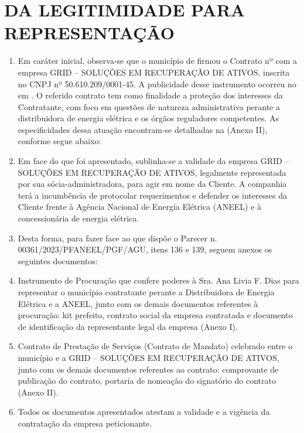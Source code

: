 \section{DA LEGITIMIDADE PARA REPRESENTAÇÃO}

\begin{enumerate}[resume]
\item Em caráter inicial, observa-se que o município de \nomeMunicipio{} firmou o Contrato nº \numeroContrato{} com a empresa GRID – SOLUÇÕES EM RECUPERAÇÃO DE ATIVOS, inscrita no CNPJ nº 50.610.209/0001-45. A publicidade desse instrumento ocorreu no \publicacao{} em \dataPublicacao{}. O referido contrato tem como finalidade a proteção dos interesses da Contratante, com foco em questões de natureza administrativa perante a distribuidora de energia elétrica e os órgãos reguladores competentes. As especificidades dessa atuação encontram-se detalhadas na \tituloClausula{} (Anexo II), conforme segue abaixo:
\Citacao{\clausula{}}
\item Em face do que foi apresentado, sublinha-se a validade da empresa GRID – SOLUÇÕES EM RECUPERAÇÃO DE ATIVOS, legalmente representada por sua sócia-administradora, para agir em nome da Cliente. A companhia terá a incumbência de protocolar requerimentos e defender os interesses da Cliente frente à Agência Nacional de Energia Elétrica (ANEEL) e à concessionária de energia elétrica. 
\item Desta forma, para fazer face ao que dispõe o Parecer n. 00361/2023/PFANEEL/PGF/AGU, itens 136 e 139, seguem anexos os seguintes documentos:  
\item Instrumento de Procuração que confere poderes à Sra. Ana Livia F. Dias para representar o município contratante perante a Distribuidora de Energia Elétrica e a ANEEL, junto com os demais documentos referentes à procuração: kit prefeito, contrato social da empresa contratada e documento de identificação da representante legal da empresa (Anexo I). 
\item Contrato de Prestação de Serviços (Contrato de Mandato) celebrado entre o município e a GRID – SOLUÇÕES EM RECUPERAÇÃO DE ATIVOS, junto com os demais documentos referentes ao contrato: comprovante de publicação do contrato, portaria de nomeação do signatório do contrato (Anexo II).  
\item Todos os documentos apresentados atestam a validade e a vigência da contratação da empresa peticionante.











\end{enumerate}
